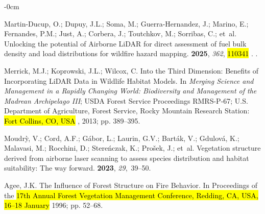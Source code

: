 \documentclass[remotesensing,article,accept,pdftex,moreauthors]{Definitions/mdpi}
\begin{document}
\begin{adjustwidth}{-\extralength}{0cm}
  \begin{thebibliography}{999}

Martin-Ducup, O.; Dupuy, J.L.; Soma, M.; Guerra-Hernandez, J.; Marino, E.;
  Fernandes, P.M.; Just, A.; Corbera, J.; Toutchkov, M.; Sorribas, C.;  et~al.
\newblock Unlocking the potential of Airborne {LiDAR} for direct assessment of
  fuel bulk density and load distributions for wildfire hazard mapping.
 {\bf 2025}, {\em
  362}, \hl{110341}%
.
.

Merrick, M.J.; Koprowski, J.L.; Wilcox, C.
\newblock Into the Third Dimension: Benefits of Incorporating {LiDAR} Data in
  Wildlife Habitat Models.
\newblock In \emph{Merging Science and Management in a Rapidly
  Changing World: Biodiversity and Management of the Madrean Archipelago III}; USDA Forest Service Proceedings RMRS-P-67; U.S. Department of Agriculture, Forest Service, Rocky Mountain Research Station: \hl{Fort Collins, CO, USA}%
, 2013; pp. 389--395.

Moudr{\`y}, V.; Cord, A.F.; G{\'a}bor, L.; Laurin, G.V.; Bart{\'a}k, V.;
  Gdulov{\'a}, K.; Malavasi, M.; Rocchini, D.; Stere{\'n}czak, K.;
  Pro{\v{s}}ek, J.;  et~al.
\newblock Vegetation structure derived from airborne laser scanning to assess
  species distribution and habitat suitability: The way forward.
 {\bf 2023}, {\em 29},~39--50.

Agee, J.K.
\newblock The Influence of Forest Structure on Fire Behavior. In Proceedings of the \hl{17th Annual Forest Vegetation Management Conference, Redding, CA, USA, 16–18 January} %
 1996;
\newblock pp. 52--68.


\end{thebibliography}
\end{adjustwidth}
\end{document}
